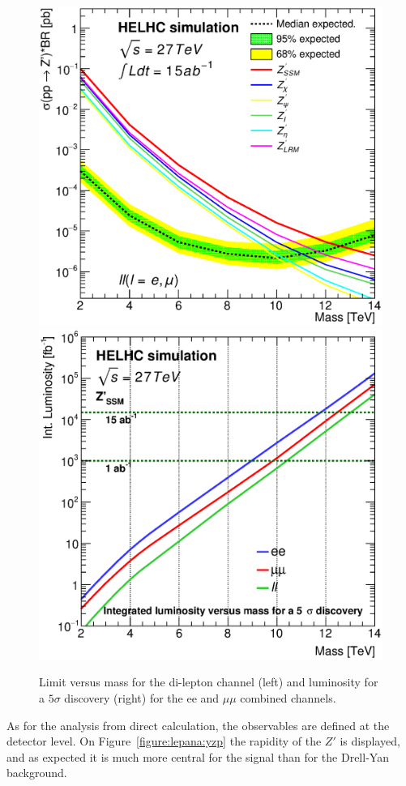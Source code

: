 \begin{figure}[!htb]
  \centering
  \includegraphics[width=0.45\columnwidth]{Fig/27tev/lim_Zprime_ll_helhc_v01_allxs.eps}
  \includegraphics[width=0.45\columnwidth]{Fig/27tev/DiscoveryPotential_ll_comb_rootStyle.eps}
  \caption{Limit versus mass for the di-lepton channel (left) and luminosity for a $5\sigma$ discovery (right) for the ee and $\mu\mu$ combined channels. }
  \label{figure:lepana:limdisc}
\end{figure}


\label{subsubsection:vardef}

As for the analysis from direct calculation, the observables are defined at the detector level. On Figure~\ref{figure:lepana:yzp} the 
rapidity of the $Z'$ is displayed, and as expected it is much more central for the signal than for the Drell-Yan background.

